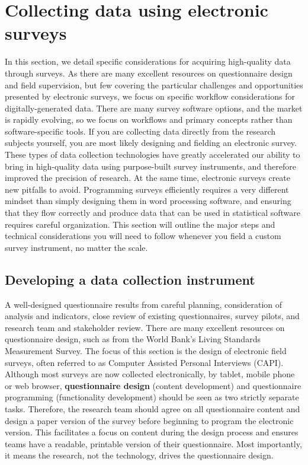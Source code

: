 \section{Collecting data using electronic surveys}
In this section, we detail specific considerations for acquiring high-quality data through surveys.
As there are many excellent resources on questionnaire design and field supervision,
but few covering the particular challenges and opportunities presented by electronic surveys,
we focus on specific workflow considerations for digitally-generated data. 
There are many survey software options, and the market is rapidly evolving,
so we focus on workflows and primary concepts rather than software-specific tools.
If you are collecting data directly from the research subjects yourself,
you are most likely designing and fielding an electronic survey.
These types of data collection technologies
have greatly accelerated our ability to bring in high-quality data
using purpose-built survey instruments,
and therefore improved the precision of research.
At the same time, electronic surveys create new pitfalls to avoid.
Programming surveys efficiently requires a very different mindset
than simply designing them in word processing software,
and ensuring that they flow correctly and produce data
that can be used in statistical software requires careful organization.
This section will outline the major steps and technical considerations
you will need to follow whenever you field a custom survey instrument,
no matter the scale.

\subsection{Developing a data collection instrument}

A well-designed questionnaire results from careful planning,
consideration of analysis and indicators, close review of existing questionnaires,
survey pilots, and research team and stakeholder review.
There are many excellent resources on questionnaire design,
such as from the World Bank's Living Standards Measurement Survey.\cite{glewwe2000designing}
The focus of this section is the design of electronic field surveys,
often referred to as Computer Assisted Personal Interviews (CAPI).
Although most surveys are now collected electronically, by tablet, mobile phone or web browser,
\textbf{questionnaire design}
(content development) and questionnaire programming (functionality development)
should be seen as two strictly separate tasks.
Therefore, the research team should agree on all questionnaire content
and design a paper version of the survey before beginning to program the electronic version.
This facilitates a focus on content during the design process
and ensures teams have a readable, printable version of their questionnaire.
Most importantly, it means the research, not the technology, drives the questionnaire design.

